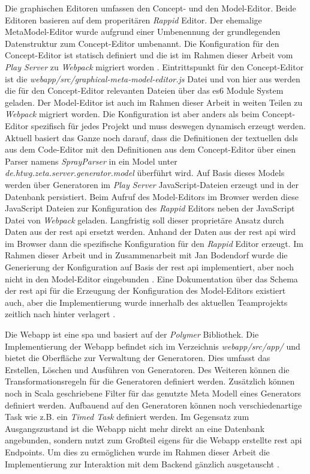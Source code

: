 Die graphischen Editoren umfassen den Concept- und den Model-Editor. Beide Editoren basieren auf dem properitären \textit{Rappid} Editor. Der ehemalige MetaModel-Editor wurde aufgrund einer Umbenennung der grundlegenden Datenstruktur zum Concept-Editor umbenannt. Die Konfiguration für den Concept-Editor ist statisch definiert und die ist im Rahmen dieser Arbeit vom \textit{Play Server} zu \textit{Webpack} migriert worden \cite{zeta_commit_resolve_via_webpack}. Eintrittspunkt für den Concept-Editor ist die \textit{webapp/src/graphical-meta-model-editor.js} Datei und von hier aus werden die für den Concept-Editor relevanten Dateien über das \ac{es6} Module System geladen. Der Model-Editor ist auch im Rahmen dieser Arbeit in weiten Teilen zu \textit{Webpack} migriert worden. Die Konfiguration ist aber anders als beim Concept-Editor spezifisch für jedes Projekt und muss deswegen dynamisch erzeugt werden. Aktuell basiert das Ganze noch darauf, dass die Definitionen der textuellen \acp{dsl} aus dem Code-Editor mit den Definitionen aus dem Concept-Editor über einen Parser namens \textit{SprayParser} in ein Model unter \textit{de.htwg.zeta.server.generator.model} überführt wird. Auf Basis dieses Models werden über Generatoren im \textit{Play Server} JavaScript-Dateien erzeugt und in der Datenbank persistiert. Beim Aufruf des Model-Editors im Browser werden diese JavaScript Dateien zur Konfiguration des \textit{Rappid} Editors neben der JavaScript Datei von \textit{Webpack} geladen. Langfristig soll dieser proprietäre Ansatz durch Daten aus der \ac{rest} \ac{api} ersetzt werden. Anhand der Daten aus der \ac{rest} \ac{api} wird im Browser dann die spezifische Konfiguration für den \textit{Rappid} Editor erzeugt. Im Rahmen dieser Arbeit und in Zusammenarbeit mit Jan Bodendorf wurde die Generierung der Konfiguration auf Basis der \ac{rest} \ac{api} implementiert, aber noch nicht in den Model-Editor eingebunden \cite{zeta_milestone_2}. Eine Dokumentation über das Schema der \ac{rest} \ac{api} für die Erzeugung der Konfiguration des Model-Editors existiert auch, aber die Implementierung wurde innerhalb des aktuellen Teamprojekts zeitlich nach hinter verlagert \cite{zeta_wiki_rest_api}.

Die Webapp ist eine \ac{spa} und basiert auf der \textit{Polymer} Bibliothek. Die Implementierung der Webapp befindet sich im Verzeichnis \textit{webapp/src/app/} und bietet die Oberfläche zur Verwaltung der Generatoren. Dies umfasst das Erstellen, Löschen und Ausführen von Generatoren. Des Weiteren können die Transformationsregeln für die Generatoren definiert werden. Zusätzlich können noch in Scala geschriebene Filter für das genutzte Meta Modell eines Generators definiert werden. Aufbauend auf den Generatoren können noch verschiedenartige Task wie z.B. ein \textit{Timed Task} definiert werden. Im Gegensatz zum Ausgangszustand ist die Webapp nicht mehr direkt an eine Datenbank angebunden, sondern nutzt zum Großteil eigens für die Webapp erstellte \ac{rest} \ac{api} Endpoints. Um dies zu ermöglichen wurde im Rahmen dieser Arbeit die Implementierung zur Interaktion mit dem Backend gänzlich ausgetauscht \cite{zeta_commit_webapp_persist}.

